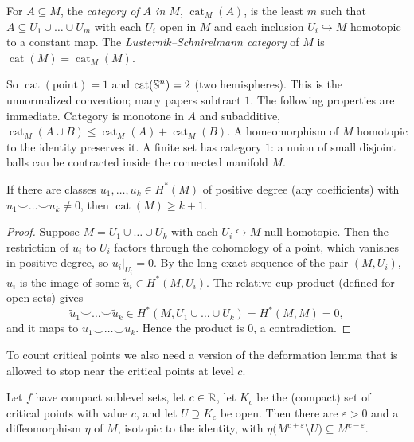 \begin{definition}\label{TOP:def:cat}
For $A\subseteq M$, the \emph{category of $A$ in $M$}, $\operatorname{cat}_M(A)$, is the least $m$ such that
$A\subseteq U_1\cup\dots\cup U_m$ with each $U_i$ open in $M$ and each inclusion $U_i\hookrightarrow M$
homotopic to a constant map. The \emph{Lusternik--Schnirelmann category} of $M$ is
$\operatorname{cat}(M)=\operatorname{cat}_M(M)$.
\end{definition}

So $\operatorname{cat}(\text{point})=1$ and $\operatorname{cat}(\mathbb{S}^n)=2$ (two hemispheres). This is the
unnormalized convention; many papers subtract $1$. The following properties are immediate.
Category is monotone in $A$ and subadditive, $\operatorname{cat}_M(A\cup B)\le\operatorname{cat}_M(A)+
\operatorname{cat}_M(B)$. A homeomorphism of $M$ homotopic to the identity preserves it. A finite set has
category $1$: a union of small disjoint balls can be contracted inside the connected manifold $M$.

\begin{theorem}\label{TOP:thm:cuplength}
If there are classes $u_1,\dots,u_k\in H^*(M)$ of positive degree (any coefficients) with
$u_1\smile\dots\smile u_k\neq0$, then $\operatorname{cat}(M)\ge k+1$.
\end{theorem}

\begin{proof}
Suppose $M=U_1\cup\dots\cup U_k$ with each $U_i\hookrightarrow M$ null-homotopic. Then the restriction
of $u_i$ to $U_i$ factors through the cohomology of a point, which vanishes in positive degree, so
$u_i|_{U_i}=0$. By the long exact sequence of the pair $(M,U_i)$, $u_i$ is the image of some
$\tilde u_i\in H^*(M,U_i)$. The relative cup product (defined for open sets) gives
\[
  \tilde u_1\smile\dots\smile\tilde u_k\in H^*(M,U_1\cup\dots\cup U_k)=H^*(M,M)=0,
\]
and it maps to $u_1\smile\dots\smile u_k$. Hence the product is $0$, a contradiction.
\end{proof}

To count critical points we also need a version of the deformation lemma that is allowed to stop near the
critical points at level $c$.

\begin{lemma}\label{TOP:lem:hole}
Let $f$ have compact sublevel sets, let $c\in\mathbb{R}$, let $K_c$ be the (compact) set of critical points
with value $c$, and let $U\supseteq K_c$ be open. Then there are $\varepsilon>0$ and a diffeomorphism
$\eta$ of $M$, isotopic to the identity, with $\eta\big(M^{c+\varepsilon}\setminus U\big)\subseteq M^{c-\varepsilon}$.
\end{lemma}

